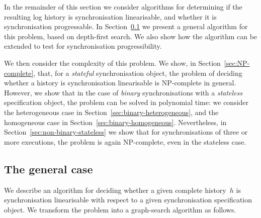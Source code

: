In the remainder of this section we consider algorithms for determining if the
resulting log history is synchronisation linearisable, and whether it is
synchronisation progressable.  In Section~\ref{sec:algorithm-dfs} we present a
general algorithm for this problem, based on depth-first search.  We also show
how the algorithm can be extended to test for synchronisation
progressibility. 

We then consider the complexity of this problem.  We show, in
Section~\ref{sec:NP-complete}, that, for a \emph{stateful} synchronisation
object, the problem of deciding whether a history is synchronisation
linearisable is NP-complete in general.  However, we show that in the case of
\emph{binary} synchronisations with a \emph{stateless} specification object,
the problem can be solved in polynomial time: we consider the heterogeneous
case in Section~\ref{sec:binary-heterogeneous}, and the homogeneous case in
Section~\ref{sec:binary-homogeneous}.  Nevertheless, in
Section~\ref{sec:non-binary-stateless} we show that for synchronisations of
three or more executions, the problem is again NP-complete, even in the
stateless case.



\subsection{The general case}
\label{sec:algorithm-dfs}

We describe an algorithm for deciding whether a given complete history~$h$ is
synchronisation linearisable with respect to a given synchronisation
specification object.  We transform the problem into a graph-search algorithm
as follows.

